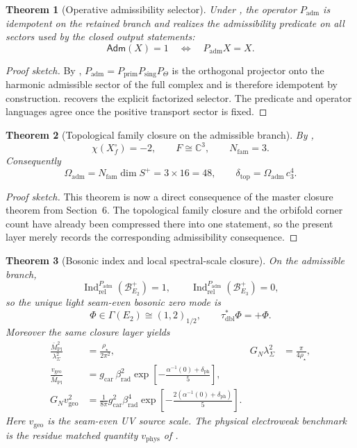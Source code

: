\documentclass[11pt,a4paper]{article}
\newtheorem{theorem}{Theorem}[section]
\theoremstyle{definition}
\theoremstyle{remark}
\DeclareMathOperator{\Ind}{Ind}
\newcommand{\taudbl}{\tau_{\mathrm{dbl}}}
\newcommand{\Mpl}{\bar M_{\mathrm{Pl}}}
\newcommand{\cthree}{c_3}
\newcommand{\deltatop}{\delta_{\mathrm{top}}}
\newcommand{\Oadm}{\Omega_{\mathrm{adm}}}
\newcommand{\gcar}{g_{\mathrm{car}}}
\newcommand{\vgeo}{v_{\mathrm{geo}}}
\newcommand{\Padm}{P_{\mathrm{adm}}}
\newcommand{\Pprim}{P_{\mathrm{prim}}}
\begin{document}
\begin{theorem}[Operative admissibility selector]
Under , the
operator $\Padm$ is idempotent on the retained branch and realizes the admissibility predicate
on all sectors used by the closed output statements:
\[
\mathsf{Adm}(X)=1
\quad\Longleftrightarrow\quad
\Padm X = X.
\]
\end{theorem}

\begin{proof}[Proof sketch]
By , $\Padm=\Pprim P_{\mathrm{sing}}P_\Theta$ is the orthogonal projector
onto the harmonic admissible sector of the full complex and is therefore idempotent by
construction.  recovers the explicit factorized
selector. The predicate and operator languages agree once the positive transport sector is fixed.
\end{proof}

\begin{theorem}[Topological family closure on the admissible branch]
By ,
\[
\chi(X_f^\circ)=-2,
\qquad
F\cong\mathbb C^3,
\qquad
N_{\mathrm{fam}}=3.
\]
Consequently
\[
\Oadm=N_{\mathrm{fam}}\dim S^+=3\times 16=48,
\qquad
\deltatop=\Oadm\,\cthree^4.
\]
\end{theorem}

\begin{proof}[Proof sketch]
This theorem is now a direct consequence of the master closure theorem from Section~6. The
topological family closure and the orbifold corner count have already been compressed there
into one statement, so the present layer merely records the corresponding admissibility
consequence.
\end{proof}

\begin{theorem}[Bosonic index and local spectral-scale closure]
On the admissible branch,
\[
\Ind_{\mathrm{rel}}^{\Padm}(\mathcal B_{E_2}^+)=1,
\qquad
\Ind_{\mathrm{rel}}^{\Padm}(\mathcal B_{E_3}^+)=0,
\]
so the unique light seam-even bosonic zero mode is
\[
\Phi\in\Gamma(E_2)\cong(1,2)_{1/2},
\qquad
\taudbl^{\ast}\Phi=+\Phi.
\]
Moreover the same closure layer yields
\[
\begin{aligned}
\frac{\Mpl^2}{\lambda_\Sigma^2}&=\frac{\rho_\star}{2\pi^2},
&
G_N\lambda_\Sigma^2&=\frac{\pi}{4\rho_\star},
\\
\frac{\vgeo}{\Mpl}&=\gcar\,\beta_{\mathrm{rad}}^2
\exp\!\left[-\frac{\alpha^{-1}(0)+\delta_{\mathrm{ph}}}{5}\right],
\\
G_N\vgeo^2&=\frac{1}{8\pi}\gcar^2\beta_{\mathrm{rad}}^4
\exp\!\left[-\frac{2(\alpha^{-1}(0)+\delta_{\mathrm{ph}})}{5}\right].
\end{aligned}
\]
Here $\vgeo$ is the seam-even UV source scale. The physical electroweak benchmark is the residue
matched quantity $v_{\mathrm{phys}}$ of .
\end{theorem}
\end{document}
